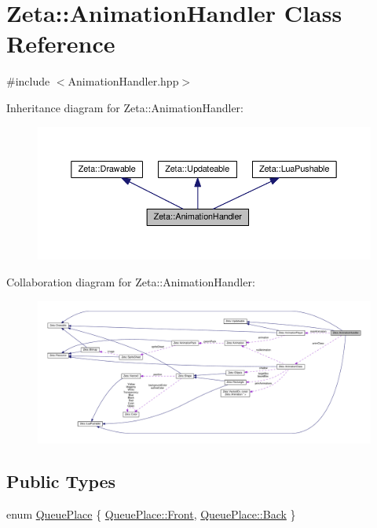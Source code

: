 \hypertarget{classZeta_1_1AnimationHandler}{\section{Zeta\+:\+:Animation\+Handler Class Reference}
\label{classZeta_1_1AnimationHandler}
}


{\ttfamily \#include $<$Animation\+Handler.\+hpp$>$}



Inheritance diagram for Zeta\+:\+:Animation\+Handler\+:\nopagebreak
\begin{figure}[H]
\begin{center}
\leavevmode
\includegraphics[width=350pt]{classZeta_1_1AnimationHandler__inherit__graph}
\end{center}
\end{figure}


Collaboration diagram for Zeta\+:\+:Animation\+Handler\+:
\nopagebreak
\begin{figure}[H]
\begin{center}
\leavevmode
\includegraphics[width=350pt]{classZeta_1_1AnimationHandler__coll__graph}
\end{center}
\end{figure}
\subsection*{Public Types}
\begin{DoxyCompactItemize}
\item 
enum \hyperlink{classZeta_1_1AnimationHandler_a7b026ece57bb2e774c0367ff0bf15f69}{Queue\+Place} \{ \hyperlink{classZeta_1_1AnimationHandler_a7b026ece57bb2e774c0367ff0bf15f69a5835bab1ade0060909e31a06af2e2cde}{Queue\+Place\+::\+Front}, 
\hyperlink{classZeta_1_1AnimationHandler_a7b026ece57bb2e774c0367ff0bf15f69a0557fa923dcee4d0f86b1409f5c2167f}{Queue\+Place\+::\+Back}
 \}
\end{DoxyCompactItemize}
